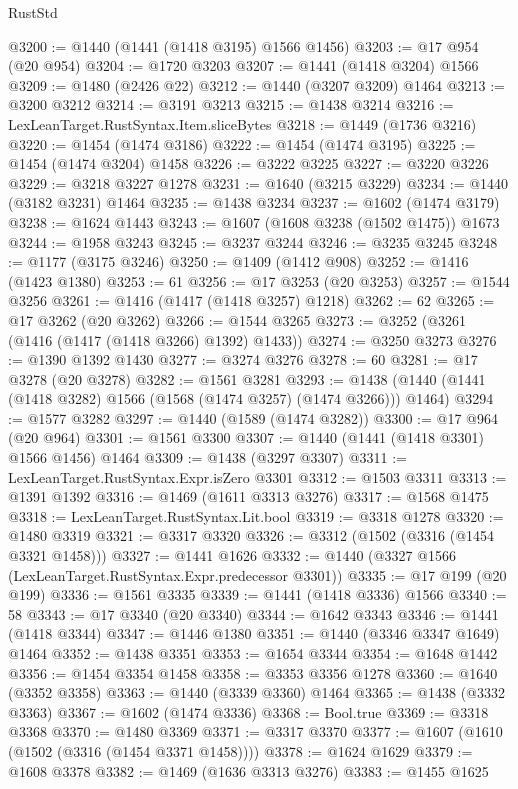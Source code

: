 \begin{lexlean}{RustStd}
\begin{coremodule}
{\begin{coremodule}
{{{{{{{{{{{{{{{{{{{{{{{{{{{{{{{@3200 := @1440 (@1441 (@1418 @3195) @1566 @1456)
@3203 := @17 @954 (@20 @954)
@3204 := @1720 @3203
@3207 := @1441 (@1418 @3204) @1566
@3209 := @1480 (@2426 @22)
@3212 := @1440 (@3207 @3209) @1464
@3213 := @3200 @3212
@3214 := @3191 @3213
@3215 := @1438 @3214
@3216 := LexLeanTarget.RustSyntax.Item.sliceBytes
@3218 := @1449 (@1736 @3216)
@3220 := @1454 (@1474 @3186)
@3222 := @1454 (@1474 @3195)
@3225 := @1454 (@1474 @3204) @1458
@3226 := @3222 @3225
@3227 := @3220 @3226
@3229 := @3218 @3227 @1278
@3231 := @1640 (@3215 @3229)
@3234 := @1440 (@3182 @3231) @1464
@3235 := @1438 @3234
@3237 := @1602 (@1474 @3179)
@3238 := @1624 @1443
@3243 := @1607 (@1608 @3238 (@1502 @1475)) @1673
@3244 := @1958 @3243
@3245 := @3237 @3244
@3246 := @3235 @3245
@3248 := @1177 (@3175 @3246)
@3250 := @1409 (@1412 @908)
@3252 := @1416 (@1423 @1380)
@3253 := 61
@3256 := @17 @3253 (@20 @3253)
@3257 := @1544 @3256
@3261 := @1416 (@1417 (@1418 @3257) @1218)
@3262 := 62
@3265 := @17 @3262 (@20 @3262)
@3266 := @1544 @3265
@3273 := @3252 (@3261 (@1416 (@1417 (@1418 @3266) @1392) @1433))
@3274 := @3250 @3273
@3276 := @1390 @1392 @1430
@3277 := @3274 @3276
@3278 := 60
@3281 := @17 @3278 (@20 @3278)
@3282 := @1561 @3281
@3293 := @1438 (@1440 (@1441 (@1418 @3282) @1566 (@1568 (@1474 @3257) (@1474 @3266))) @1464)
@3294 := @1577 @3282
@3297 := @1440 (@1589 (@1474 @3282))
@3300 := @17 @964 (@20 @964)
@3301 := @1561 @3300
@3307 := @1440 (@1441 (@1418 @3301) @1566 @1456) @1464
@3309 := @1438 (@3297 @3307)
@3311 := LexLeanTarget.RustSyntax.Expr.isZero @3301
@3312 := @1503 @3311
@3313 := @1391 @1392
@3316 := @1469 (@1611 @3313 @3276)
@3317 := @1568 @1475
@3318 := LexLeanTarget.RustSyntax.Lit.bool
@3319 := @3318 @1278
@3320 := @1480 @3319
@3321 := @3317 @3320
@3326 := @3312 (@1502 (@3316 (@1454 @3321 @1458)))
@3327 := @1441 @1626
@3332 := @1440 (@3327 @1566 (LexLeanTarget.RustSyntax.Expr.predecessor @3301))
@3335 := @17 @199 (@20 @199)
@3336 := @1561 @3335
@3339 := @1441 (@1418 @3336) @1566
@3340 := 58
@3343 := @17 @3340 (@20 @3340)
@3344 := @1642 @3343
@3346 := @1441 (@1418 @3344)
@3347 := @1446 @1380
@3351 := @1440 (@3346 @3347 @1649) @1464
@3352 := @1438 @3351
@3353 := @1654 @3344
@3354 := @1648 @1442
@3356 := @1454 @3354 @1458
@3358 := @3353 @3356 @1278
@3360 := @1640 (@3352 @3358)
@3363 := @1440 (@3339 @3360) @1464
@3365 := @1438 (@3332 @3363)
@3367 := @1602 (@1474 @3336)
@3368 := Bool.true
@3369 := @3318 @3368
@3370 := @1480 @3369
@3371 := @3317 @3370
@3377 := @1607 (@1610 (@1502 (@3316 (@1454 @3371 @1458))))
@3378 := @1624 @1629
@3379 := @1608 @3378
@3382 := @1469 (@1636 @3313 @3276)
@3383 := @1455 @1625
}}}}}}}}}}}}}}}}}}}}}}}}}}}}}}}
\end{coremodule}}
\end{coremodule}
\end{lexlean}
